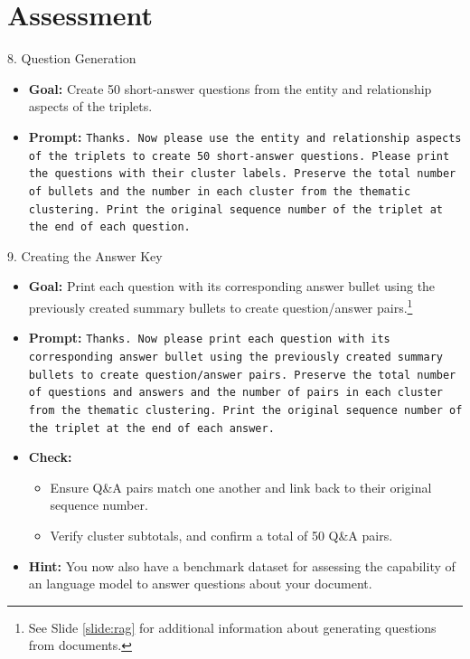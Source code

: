 \documentclass[aspectratio=169]{beamer}
\begin{document}
\section{Assessment}

\begin{frame}{8. Question Generation}
\begin{itemize}
  \item \textbf{Goal:} Create 50 short-answer questions from the entity and relationship aspects of the triplets.
  \item \textbf{Prompt:} \texttt{Thanks. Now please use the entity and relationship aspects of the triplets to create 50 short-answer questions. Please print the questions with their cluster labels. Preserve the total number of bullets and the number in each cluster from the thematic clustering. Print the original sequence number of the triplet at the end of each question.}
\end{itemize}
\end{frame}

\begin{frame}{9. Creating the Answer Key}\label{slide:q_a}
\begin{itemize}
  \item \textbf{Goal:} Print each question with its corresponding answer bullet using the previously created summary bullets to create question/answer pairs.\footnote{See Slide \ref{slide:rag} for additional information about generating questions from documents.}
  \item \textbf{Prompt:} \texttt{Thanks. Now please print each question with its corresponding answer bullet using the previously created summary bullets to create question/answer pairs. Preserve the total number of questions and answers and the number of pairs in each cluster from the thematic clustering. Print the original sequence number of the triplet at the end of each answer.}
  \item \textbf{Check:}
    \begin{itemize}
      \item Ensure Q\&A pairs match one another and link back to their original sequence number.
      \item Verify cluster subtotals, and confirm a total of 50 Q\&A pairs.
    \end{itemize}
  \item \textbf{Hint:} You now also have a benchmark dataset for assessing the capability of an language model to answer questions about your document.
\end{itemize}
\end{frame}
\end{document}
